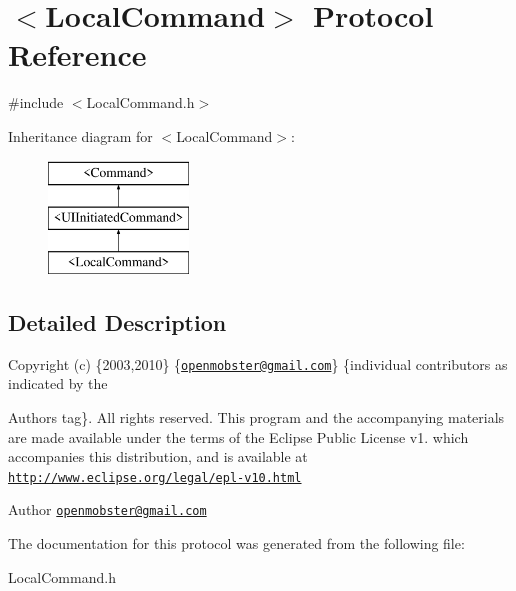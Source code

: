 \hypertarget{protocol_local_command-p}{
\section{$<$\-Local\-Command$>$ \-Protocol \-Reference}
\label{protocol_local_command-p}
}


{\ttfamily \#include $<$\-Local\-Command.\-h$>$}

\-Inheritance diagram for $<$\-Local\-Command$>$\-:\begin{figure}[H]
\begin{center}
\leavevmode
\includegraphics[height=3.000000cm]{protocol_local_command-p}
\end{center}
\end{figure}


\subsection{\-Detailed \-Description}
\-Copyright (c) \{2003,2010\} \{\href{mailto:openmobster@gmail.com}{\tt openmobster@gmail.\-com}\} \{individual contributors as indicated by the \begin{DoxyAuthor}{\-Authors}
tag\}. \-All rights reserved. \-This program and the accompanying materials are made available under the terms of the \-Eclipse \-Public \-License v1. which accompanies this distribution, and is available at \href{http://www.eclipse.org/legal/epl-v10.html}{\tt http\-://www.\-eclipse.\-org/legal/epl-\/v10.\-html}
\end{DoxyAuthor}
\begin{DoxyAuthor}{\-Author}
\href{mailto:openmobster@gmail.com}{\tt openmobster@gmail.\-com} 
\end{DoxyAuthor}


\-The documentation for this protocol was generated from the following file\-:\begin{DoxyCompactItemize}
\item 
\-Local\-Command.\-h\end{DoxyCompactItemize}
